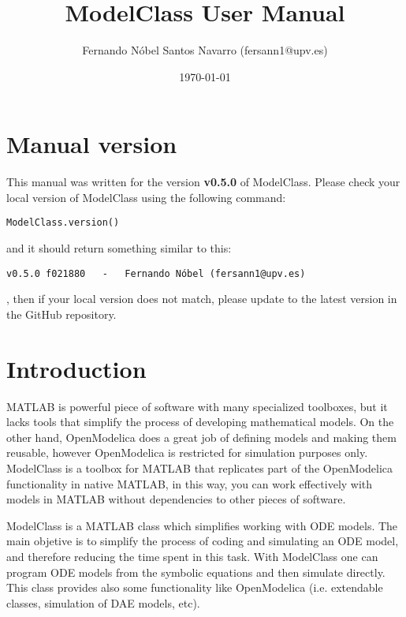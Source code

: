 \documentclass[11pt]{article}
\title{ModelClass User Manual}
\author{Fernando Nóbel Santos Navarro (fersann1@upv.es)}
\date{\today}
\begin{document}
\maketitle

\tableofcontents

\newpage 

\setlength{\parskip}{0.5em}

\section{Manual version}

This manual was written for the version \textbf{ 
v0.5.0
} of ModelClass. Please check your local version of ModelClass using the following command:

\begin{lstlisting}
ModelClass.version()
\end{lstlisting}

and it should return something similar to this:

\begin{lstlisting}
v0.5.0 f021880   -   Fernando Nóbel (fersann1@upv.es)\end{lstlisting}
, then if your local version does not match, please update to the latest version in the GitHub repository.

\section{Introduction}

MATLAB is powerful piece of software with many specialized toolboxes, but it lacks tools that simplify the process of developing mathematical models.
On the other hand, OpenModelica does a great job of defining models and making them reusable, however OpenModelica is restricted for simulation purposes only.
ModelClass is a toolbox for MATLAB that replicates part of the OpenModelica functionality in native MATLAB, in this way, you can work effectively with models in MATLAB without dependencies to other pieces of software.

ModelClass is a MATLAB class which simplifies working with ODE models. The main objetive is to simplify the process of coding and simulating an ODE model, and therefore reducing the time spent in this task. With ModelClass one can program ODE models from the symbolic equations and then simulate directly. This class provides also some functionality like OpenModelica (i.e. extendable classes, simulation of DAE models, etc).
\end{document}

